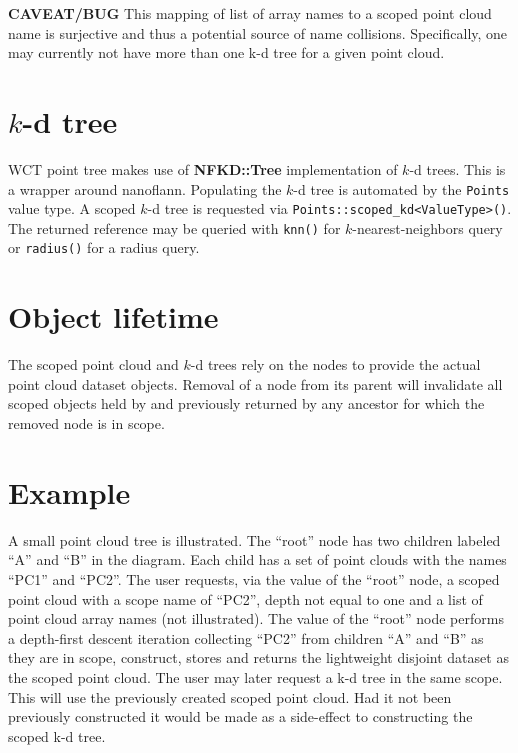 \documentclass{article}
\begin{document}
\textbf{CAVEAT/BUG} This mapping of list of array names to a scoped point cloud name is surjective and thus a potential source of name collisions.  Specifically, one may currently not have more than one k-d tree for a given point cloud.

\section{$k$-d tree}

WCT point tree makes use of \textbf{NFKD::Tree} implementation of $k$-d trees.  This is a wrapper around nanoflann.   Populating the $k$-d tree is automated by the \texttt{Points} value type.  A scoped $k$-d tree is requested via \verb|Points::scoped_kd<ValueType>()|.  The returned reference may be queried with \texttt{knn()} for $k$-nearest-neighbors query or \texttt{radius()} for a radius query.

\section{Object lifetime}

The scoped point cloud and $k$-d trees rely on the nodes to provide the actual point cloud dataset objects.  Removal of a node from its parent will invalidate all scoped objects held by and previously returned by any ancestor for which the removed node is in scope.  

\section{Example}

A small point cloud tree is illustrated.  The ``root'' node has two children labeled ``A'' and ``B'' in the diagram.  Each child has a set of point clouds with the names ``PC1'' and ``PC2''.  The user requests, via the value of the ``root'' node, a scoped point cloud with a scope name of ``PC2'',  depth not equal to one and a list of point cloud array names (not illustrated).  The value of the ``root'' node performs a depth-first descent iteration collecting ``PC2'' from children ``A'' and ``B'' as they are in scope, construct, stores and returns the lightweight disjoint dataset as the scoped point cloud.  The user may later request a k-d tree in the same scope.  This will use the previously created scoped point cloud.  Had it not been previously constructed it would be made as a side-effect to constructing the scoped k-d tree.
\end{document}
